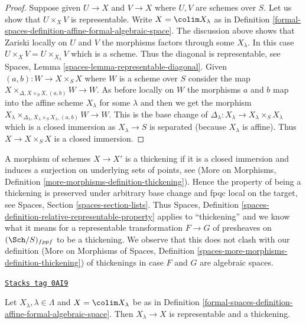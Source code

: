 \begin{proof}
Suppose given $U \to X$ and $V \to X$ where $U, V$ are schemes over $S$.
Let us show that $U \times_X V$ is representable. Write $X = \colim X_\lambda$
as in Definition \ref{formal-spaces-definition-affine-formal-algebraic-space}.
The discussion above shows that Zariski locally on $U$ and $V$ the morphisms
factors through some $X_\lambda$. In this case
$U \times_X V = U \times_{X_\lambda} V$ which is a scheme.
Thus the diagonal is representable, see
Spaces, Lemma \ref{spaces-lemma-representable-diagonal}.
Given $(a, b) : W \to X \times_S X$ where $W$ is a scheme over $S$
consider the map $X \times_{\Delta, X \times_S X, (a, b)} W \to W$.
As before locally on $W$ the morphisms $a$ and $b$ map into
the affine scheme $X_\lambda$ for some $\lambda$ and then
we get the morphism
$X_\lambda
\times_{\Delta_\lambda, X_\lambda \times_S X_\lambda, (a, b)} W \to W$.
This is the base change of
$\Delta_\lambda : X_\lambda \to X_\lambda \times_S X_\lambda$
which is a closed immersion as $X_\lambda \to S$ is separated
(because $X_\lambda$ is affine).
Thus $X \to X \times_S X$ is a closed immersion.
\end{proof}

A morphism of schemes $X \to X'$ is a thickening if it is a closed immersion
and induces a surjection on underlying sets of points, see
(More on Morphisms, Definition
\ref{more-morphisms-definition-thickening}).
Hence the property of being a thickening is preserved under arbitrary
base change and fpqc local on the target, see
Spaces, Section \ref{spaces-section-lists}.
Thus Spaces, Definition \ref{spaces-definition-relative-representable-property}
applies to ``thickening'' and we know what it means for a
representable transformation $F \to G$ of
presheaves on $(\Sch/S)_{fppf}$ to be a thickening.
We observe that this does not clash with our definition
(More on Morphisms of Spaces, Definition
\ref{spaces-more-morphisms-definition-thickening})
of thickenings in case $F$ and $G$ are algebraic spaces.

\begin{lemma}
\label{formal-spaces-lemma-covering-by-thickenings}
\href{https://stacks.math.columbia.edu/tag/0AI9}{\texttt{Stacks tag 0AI9}}

Let $X_\lambda, \lambda \in \Lambda$ and $X = \colim X_\lambda$
be as in Definition \ref{formal-spaces-definition-affine-formal-algebraic-space}.
Then $X_\lambda \to X$ is representable and a thickening.
\end{lemma}

